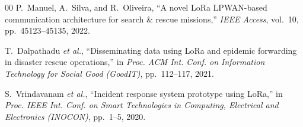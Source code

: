 \documentclass[conference]{IEEEtran}
\begin{document}
\begin{thebibliography}{00}
P.~Manuel, A.~Silva, and R.~Oliveira, ``A novel LoRa LPWAN-based communication architecture for search \& rescue missions,'' \emph{IEEE Access}, vol.~10, pp.~45123--45135, 2022.

T.~Dalpathadu \emph{et al.}, ``Disseminating data using LoRa and epidemic forwarding in disaster rescue operations,'' in \emph{Proc. ACM Int. Conf. on Information Technology for Social Good (GoodIT)}, pp.~112--117, 2021.

S.~Vrindavanam \emph{et al.}, ``Incident response system prototype using LoRa,'' in \emph{Proc. IEEE Int. Conf. on Smart Technologies in Computing, Electrical and Electronics (INOCON)}, pp.~1--5, 2020.

\end{thebibliography}
\end{document}
